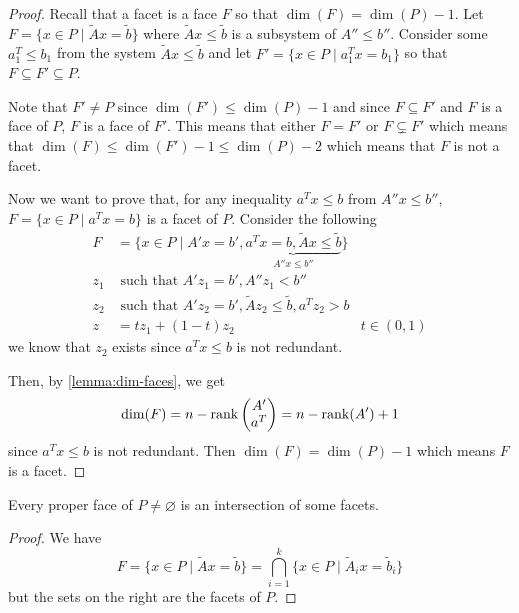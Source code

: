 \documentclass[12pt]{extarticle}
\begin{document}
\begin{proof}
	Recall that a facet is a face $F$ so that $\dim(F) = \dim(P) -1$.
	Let $F = \{x \in P \mid \tilde A x = \tilde b\}$ where $\tilde A x \leq \tilde b$ is a subsystem
	of $A'' \leq b''$.
	Consider some $a_1^T \leq b_1$ from the system $\tilde A x \leq \tilde b$ and let
	$F' = \{ x \in P \mid a^T_1 x = b_1 \}$ so that $F \subseteq F' \subseteq P$.

	Note that $F' \neq P$ since $\dim(F') \leq \dim(P) - 1$ and since $F \subseteq F'$ and $F$ is
	a face of $P$, $F$ is a face of $F'$.
	This means that either $F = F'$ or $F \subsetneq F'$ which means that
	$\dim(F) \leq \dim(F') -1 \leq \dim (P) -2$ which means that $F$ is not a facet.

	Now we want to prove that, for any inequality $a^T x \leq b$ from $A'' x \leq b ''$,
	$F = \{ x \in P \mid a^T x = b \}$ is a facet of $P$.
	Consider the following
	\begin{align}
		F   & = \{ x \in P \mid A'x = b', \underbrace{a^T x = b, \tilde A x \leq \tilde b}_{A'' x \leq b''} \}               \\
		z_1 & \text{ such that } A'z_1 = b', A'' z_1 < b''                                                                   \\
		z_2 & \text{ such that } A'z_2 = b', \tilde A z_2 \leq \tilde b, a^T z_2 > b                                         \\
		z   & = tz_1 + (1-t) z_2                                                                               & t \in (0,1)
	\end{align}
	we know that $z_2$ exists since $a^T x \leq b$ is not redundant.

	Then, by \cref{lemma:dim-faces}, we get
	\begin{equation}
		\dim(F) = n - \rank\begin{pmatrix} A'\\a^T \end{pmatrix} = n- \mathrm{rank}(A') + 1
	\end{equation}
	since $a^Tx \leq b$ is not redundant.
	Then $\dim(F) = \dim(P) -1$ which means $F$ is a facet.
\end{proof}

\begin{corollary}{}{}
	Every proper face of $P \neq \varnothing$ is an intersection of some facets.
\end{corollary}

\begin{proof}
	We have
	\begin{equation}
		F = \{x \in P \mid \tilde A x = \tilde b \} =
		\bigcap_{i = 1}^k \{x\in P \mid \tilde A_i x = \tilde b_i \}
	\end{equation}
	but the sets on the right are the facets of $P$.
\end{proof}
\end{document}
